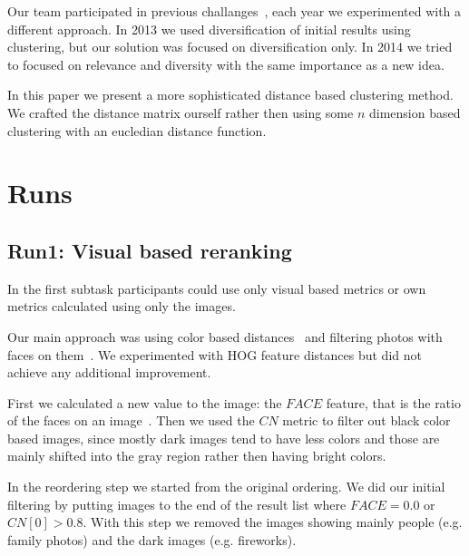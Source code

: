 \documentclass{sig-alternate}
\begin{document}
Our team participated in previous challanges~\cite{szHucs2013bmemtm,Paroczi2014}, each year we experimented with a different approach. In 2013 we used diversification of initial results using clustering, but our solution was focused on diversification only. In 2014 we tried to focused on relevance and diversity with the same importance as a new idea.

In this paper we present a more sophisticated distance based clustering method. We crafted the distance matrix ourself rather then using some $n$ dimension based clustering with an eucledian distance function. 

\section{Runs}

\subsection{Run1: Visual based reranking}
In the first subtask participants could use only visual based metrics or own metrics calculated using only the images.

Our main approach was using color based distances~\cite{Datta2008,Paramita2010} and filtering photos with faces on them~\cite{szHucs2013bmemtm,Paroczi2014}. We experimented with HOG feature distances but did not achieve any additional improvement.

First we calculated a new value to the image: the $FACE$ feature, that is the ratio of the faces on an image~\cite{szHucs2013bmemtm}. Then we used the $CN$ metric to filter out black color based images, since mostly dark images tend to have less colors and those are mainly shifted into the gray region rather then having bright colors.

In the reordering step we started from the original ordering. We did our initial filtering by putting images to the end of the result list where $FACE=0.0$ or $CN[0]>0.8$. With this step we removed the images showing mainly people (e.g. family photos) and the dark images (e.g. fireworks). 
\end{document}
